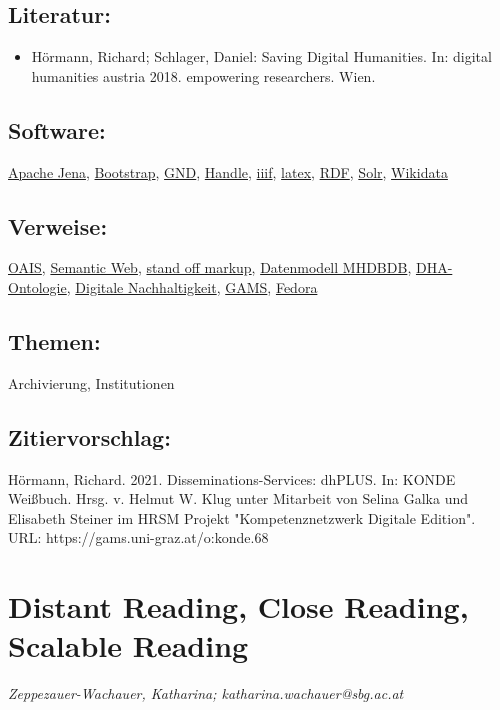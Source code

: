 \documentclass{article}
\begin{document}
        \subsection*{Literatur:}\begin{itemize}\item Hörmann, Richard; Schlager, Daniel: Saving Digital Humanities. In: digital humanities austria 2018. empowering researchers. Wien.\end{itemize}\subsection*{Software:}\href{https://jena.apache.org/}{Apache Jena}, \href{https://getbootstrap.com/}{Bootstrap}, \href{http://www.dnb.de/DE/Standardisierung/GND/gnd_node.html}{GND}, \href{http://www.handle.net/}{Handle}, \href{https://iiif.io/}{iiif}, \href{https://www.latex-project.org/}{latex}, \href{https://www.w3.org/RDF/}{RDF}, \href{http://lucene.apache.org/solr/}{Solr}, \href{https://www.wikidata.org/wiki/Wikidata:Main_Page}{Wikidata}\subsection*{Verweise:}\href{https://gams.uni-graz.at/o:konde.11}{OAIS}, \href{https://gams.uni-graz.at/o:konde.167}{Semantic Web}, \href{https://gams.uni-graz.at/o:konde.171}{stand off markup}, \href{https://gams.uni-graz.at/o:konde.52}{Datenmodell MHDBDB}, \href{https://gams.uni-graz.at/o:konde.5}{DHA-Ontologie}, \href{https://gams.uni-graz.at/o:konde.6}{Digitale Nachhaltigkeit}, \href{https://gams.uni-graz.at/o:konde.70}{GAMS}, \href{https://gams.uni-graz.at/o:konde.69}{Fedora}\subsection*{Themen:}Archivierung, Institutionen\subsection*{Zitiervorschlag:}Hörmann, Richard. 2021. Disseminations-Services: dhPLUS. In: KONDE Weißbuch. Hrsg. v. Helmut W. Klug unter Mitarbeit von Selina Galka und Elisabeth Steiner im HRSM Projekt "Kompetenznetzwerk Digitale Edition". URL: https://gams.uni-graz.at/o:konde.68\newpage\section*{Distant Reading, Close Reading, Scalable Reading} \emph{Zeppezauer-Wachauer, Katharina; katharina.wachauer@sbg.ac.at }\\
        
\end{document}
